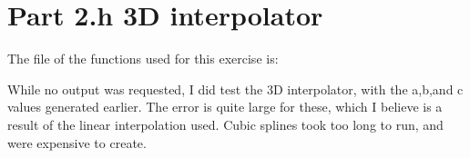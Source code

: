 \section{Part 2.h 3D interpolator}

The file of the functions used for this exercise is:



While no output was requested, I did test the 3D interpolator, with the a,b,and c values generated earlier.
The error is quite large for these, which I believe is a result of the linear interpolation used. Cubic splines took too
long to run, and were expensive to create.





